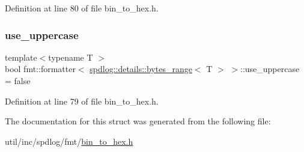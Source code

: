 Definition at line 80 of file bin\+\_\+to\+\_\+hex.\+h.

\mbox{\label{structfmt_1_1formatter_3_01spdlog_1_1details_1_1bytes__range_3_01_t_01_4_01_4_a0974264e6edcc83c7c191f34d2ce4781}} 
\subsubsection{\texorpdfstring{use\+\_\+uppercase}{use\_uppercase}}
{\footnotesize\ttfamily template$<$typename T $>$ \\
bool fmt\+::formatter$<$ \hyperlink{classspdlog_1_1details_1_1bytes__range}{spdlog\+::details\+::bytes\+\_\+range}$<$ T $>$ $>$\+::use\+\_\+uppercase = false}



Definition at line 79 of file bin\+\_\+to\+\_\+hex.\+h.



The documentation for this struct was generated from the following file\+:\begin{DoxyCompactItemize}
\item 
util/inc/spdlog/fmt/\hyperlink{bin__to__hex_8h}{bin\+\_\+to\+\_\+hex.\+h}\end{DoxyCompactItemize}
